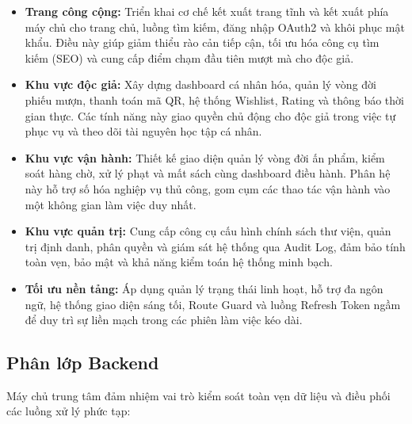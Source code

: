 \begin{itemize}
    \item \textbf{Trang công cộng:} Triển khai cơ chế kết xuất trang tĩnh và kết xuất phía máy chủ cho trang chủ, luồng tìm kiếm, đăng nhập OAuth2 và khôi phục mật khẩu. Điều này giúp giảm thiểu rào cản tiếp cận, tối ưu hóa công cụ tìm kiếm (SEO) và cung cấp điểm chạm đầu tiên mượt mà cho độc giả.
    \item \textbf{Khu vực độc giả:} Xây dựng dashboard cá nhân hóa, quản lý vòng đời phiếu mượn, thanh toán mã QR, hệ thống Wishlist, Rating và thông báo thời gian thực. Các tính năng này giao quyền chủ động cho độc giả trong việc tự phục vụ và theo dõi tài nguyên học tập cá nhân.
    \item \textbf{Khu vực vận hành:} Thiết kế giao diện quản lý vòng đời ấn phẩm, kiểm soát hàng chờ, xử lý phạt và mất sách cùng dashboard điều hành. Phân hệ này hỗ trợ số hóa nghiệp vụ thủ công, gom cụm các thao tác vận hành vào một không gian làm việc duy nhất.
    \item \textbf{Khu vực quản trị:} Cung cấp công cụ cấu hình chính sách thư viện, quản trị định danh, phân quyền và giám sát hệ thống qua Audit Log, đảm bảo tính toàn vẹn, bảo mật và khả năng kiểm toán hệ thống minh bạch.
    \item \textbf{Tối ưu nền tảng:} Áp dụng quản lý trạng thái linh hoạt, hỗ trợ đa ngôn ngữ, hệ thống giao diện sáng tối, Route Guard và luồng Refresh Token ngầm để duy trì sự liền mạch trong các phiên làm việc kéo dài.
\end{itemize}

\subsection{Phân lớp Backend}

Máy chủ trung tâm đảm nhiệm vai trò kiểm soát toàn vẹn dữ liệu và điều phối các luồng xử lý phức tạp:

